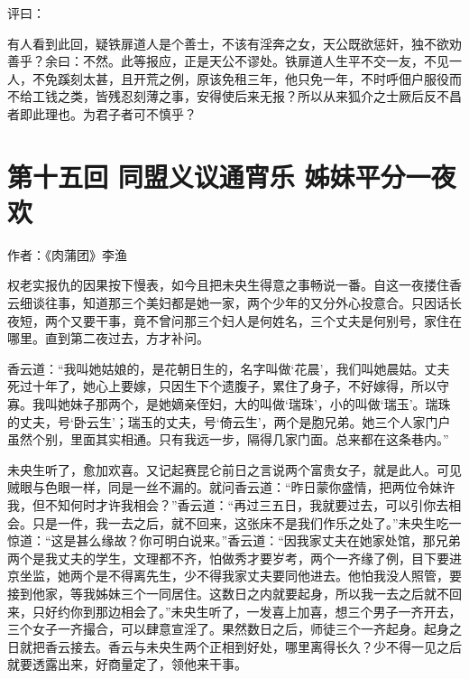 \documentclass[a4paper,12pt,UTF8,twoside]{ctexbook}
\begin{document}
评曰：

有人看到此回，疑铁扉道人是个善士，不该有淫奔之女，天公既欲惩奸，独不欲劝善乎？余曰：不然。此等报应，正是天公不谬处。铁扉道人生平不交一友，不见一人，不免蹊刻太甚，且开荒之例，原该免租三年，他只免一年，不时呼佃户服役而不给工钱之类，皆残忍刻薄之事，安得使后来无报？所以从来狐介之士厥后反不昌者即此理也。为君子者可不慎乎？

\chapter{第十五回 同盟义议通宵乐 姊妹平分一夜欢}

作者：《肉蒲团》李渔

权老实报仇的因果按下慢表，如今且把未央生得意之事畅说一番。自这一夜搂住香云细谈往事，知道那三个美妇都是她一家，两个少年的又分外心投意合。只因话长夜短，两个又要干事，竟不曾问那三个妇人是何姓名，三个丈夫是何别号，家住在哪里。直到第二夜过去，方才补问。

香云道：“我叫她姑娘的，是花朝日生的，名字叫做‘花晨’，我们叫她晨姑。丈夫死过十年了，她心上要嫁，只因生下个遗腹子，累住了身子，不好嫁得，所以守寡。我叫她妹子那两个，是她嫡亲侄妇，大的叫做‘瑞珠’，小的叫做‘瑞玉’。瑞珠的丈夫，号‘卧云生’；瑞玉的丈夫，号‘倚云生’，两个是胞兄弟。她三个人家门户虽然个别，里面其实相通。只有我远一步，隔得几家门面。总来都在这条巷内。”

未央生听了，愈加欢喜。又记起赛昆仑前日之言说两个富贵女子，就是此人。可见贼眼与色眼一样，同是一丝不漏的。就问香云道：“昨日蒙你盛情，把两位令妹许我，但不知何时才许我相会？”香云道：“再过三五日，我就要过去，可以引你去相会。只是一件，我一去之后，就不回来，这张床不是我们作乐之处了。”未央生吃一惊道：“这是甚么缘故？你可明白说来。”香云道：“因我家丈夫在她家处馆，那兄弟两个是我丈夫的学生，文理都不齐，怕做秀才要岁考，两个一齐缘了例，目下要进京坐监，她两个是不得离先生，少不得我家丈夫要同他进去。他怕我没人照管，要接到他家，等我姊妹三个一同居住。这数日之内就要起身，所以我一去之后就不回来，只好约你到那边相会了。”未央生听了，一发喜上加喜，想三个男子一齐开去，三个女子一齐撮合，可以肆意宣淫了。果然数日之后，师徒三个一齐起身。起身之日就把香云接去。香云与未央生两个正相到好处，哪里离得长久？少不得一见之后就要透露出来，好商量定了，领他来干事。
\end{document}
